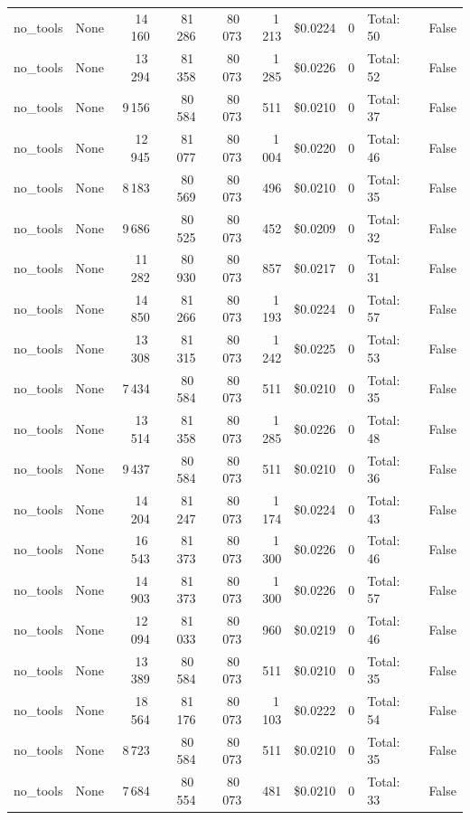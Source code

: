 \documentclass[a4paper,11pt]{article}
\begin{document}
\begin{table}[H]
{\begin{tabular}{l r r r r r r r l r}
no\_tools & None & 14\,160 & 81\,286 & 80\,073 & 1\,213 & \$0.0224 & 0 & Total: 50 & False \\
no\_tools & None & 13\,294 & 81\,358 & 80\,073 & 1\,285 & \$0.0226 & 0 & Total: 52 & False \\
no\_tools & None & 9\,156 & 80\,584 & 80\,073 & 511 & \$0.0210 & 0 & Total: 37 & False \\
no\_tools & None & 12\,945 & 81\,077 & 80\,073 & 1\,004 & \$0.0220 & 0 & Total: 46 & False \\
no\_tools & None & 8\,183 & 80\,569 & 80\,073 & 496 & \$0.0210 & 0 & Total: 35 & False \\
no\_tools & None & 9\,686 & 80\,525 & 80\,073 & 452 & \$0.0209 & 0 & Total: 32 & False \\
no\_tools & None & 11\,282 & 80\,930 & 80\,073 & 857 & \$0.0217 & 0 & Total: 31 & False \\
no\_tools & None & 14\,850 & 81\,266 & 80\,073 & 1\,193 & \$0.0224 & 0 & Total: 57 & False \\
no\_tools & None & 13\,308 & 81\,315 & 80\,073 & 1\,242 & \$0.0225 & 0 & Total: 53 & False \\
no\_tools & None & 7\,434 & 80\,584 & 80\,073 & 511 & \$0.0210 & 0 & Total: 35 & False \\
no\_tools & None & 13\,514 & 81\,358 & 80\,073 & 1\,285 & \$0.0226 & 0 & Total: 48 & False \\
no\_tools & None & 9\,437 & 80\,584 & 80\,073 & 511 & \$0.0210 & 0 & Total: 36 & False \\
no\_tools & None & 14\,204 & 81\,247 & 80\,073 & 1\,174 & \$0.0224 & 0 & Total: 43 & False \\
no\_tools & None & 16\,543 & 81\,373 & 80\,073 & 1\,300 & \$0.0226 & 0 & Total: 46 & False \\
no\_tools & None & 14\,903 & 81\,373 & 80\,073 & 1\,300 & \$0.0226 & 0 & Total: 57 & False \\
no\_tools & None & 12\,094 & 81\,033 & 80\,073 & 960 & \$0.0219 & 0 & Total: 46 & False \\
no\_tools & None & 13\,389 & 80\,584 & 80\,073 & 511 & \$0.0210 & 0 & Total: 35 & False \\
no\_tools & None & 18\,564 & 81\,176 & 80\,073 & 1\,103 & \$0.0222 & 0 & Total: 54 & False \\
no\_tools & None & 8\,723 & 80\,584 & 80\,073 & 511 & \$0.0210 & 0 & Total: 35 & False \\
no\_tools & None & 7\,684 & 80\,554 & 80\,073 & 481 & \$0.0210 & 0 & Total: 33 & False \\

\end{tabular}}
\end{table}
\end{document}
